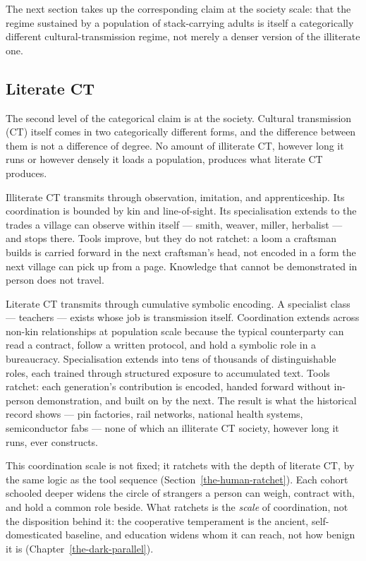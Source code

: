 \documentclass[12pt,letterpaper]{article}
\begin{document}
The next section takes up the corresponding claim at the society
scale: that the regime sustained by a population of stack-carrying
adults is itself a categorically different cultural-transmission
regime, not merely a denser version of the illiterate one.

\subsection{Literate CT}\label{literate-ct}

The second level of the categorical claim is at the society. Cultural
transmission (CT) itself comes in two categorically different forms,
and the difference between them is not a difference of degree. No
amount of illiterate CT, however long it runs or however densely it
loads a population, produces what literate CT produces.

Illiterate CT transmits through observation, imitation, and
apprenticeship. Its coordination is bounded by kin and line-of-sight.
Its specialisation extends to the trades a village can observe within
itself --- smith, weaver, miller, herbalist --- and stops there.
Tools improve, but they do not ratchet: a loom a craftsman builds is
carried forward in the next craftsman's head, not encoded in a form
the next village can pick up from a page. Knowledge that cannot be
demonstrated in person does not travel.

Literate CT transmits through cumulative symbolic encoding. A
specialist class --- teachers --- exists whose job is transmission
itself. Coordination extends across non-kin relationships at
population scale because the typical counterparty can read a
contract, follow a written protocol, and hold a symbolic role in a
bureaucracy. Specialisation extends into tens of thousands of
distinguishable roles, each trained through structured exposure to
accumulated text. Tools ratchet: each generation's contribution is
encoded, handed forward without in-person demonstration, and built on
by the next. The result is what the historical record shows --- pin
factories, rail networks, national health systems, semiconductor fabs
--- none of which an illiterate CT society, however long it runs,
ever constructs.

This coordination scale is not fixed; it ratchets with the depth of
literate CT, by the same logic as the tool sequence
(Section~\ref{the-human-ratchet}). Each cohort schooled deeper widens
the circle of strangers a person can weigh, contract with, and hold a
common role beside. What ratchets is the \emph{scale} of coordination,
not the disposition behind it: the cooperative temperament is the
ancient, self-domesticated baseline, and education widens whom it can
reach, not how benign it is (Chapter~\ref{the-dark-parallel}).
\end{document}
